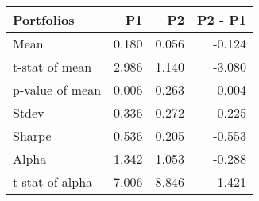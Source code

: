\begin{tabular}{lrrr}
\toprule
Portfolios & P1 & P2 & P2 - P1 \\
\midrule
Mean & 0.180 & 0.056 & -0.124 \\
t-stat of mean & 2.986 & 1.140 & -3.080 \\
p-value of mean & 0.006 & 0.263 & 0.004 \\
Stdev & 0.336 & 0.272 & 0.225 \\
Sharpe & 0.536 & 0.205 & -0.553 \\
Alpha & 1.342 & 1.053 & -0.288 \\
t-stat of alpha & 7.006 & 8.846 & -1.421 \\
\bottomrule
\end{tabular}
